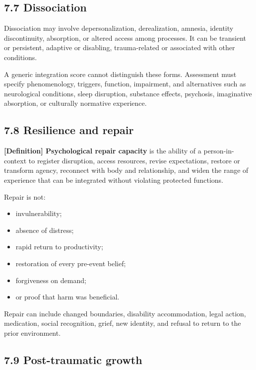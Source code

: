 \documentclass[
  11pt,
]{article}
\providecommand{\tightlist}{%
  \setlength{\itemsep}{0pt}\setlength{\parskip}{0pt}}
\begin{document}
\subsection{7.7 Dissociation}\label{dissociation}

Dissociation may involve depersonalization, derealization, amnesia,
identity discontinuity, absorption, or altered access among processes.
It can be transient or persistent, adaptive or disabling, trauma-related
or associated with other conditions.

A generic integration score cannot distinguish these forms. Assessment
must specify phenomenology, triggers, function, impairment, and
alternatives such as neurological conditions, sleep disruption,
substance effects, psychosis, imaginative absorption, or culturally
normative experience.

\subsection{7.8 Resilience and repair}\label{resilience-and-repair}

\textbf{{[}Definition{]} Psychological repair capacity} is the ability
of a person-in-context to register disruption, access resources, revise
expectations, restore or transform agency, reconnect with body and
relationship, and widen the range of experience that can be integrated
without violating protected functions.

Repair is not:

\begin{itemize}
\tightlist
\item
  invulnerability;
\item
  absence of distress;
\item
  rapid return to productivity;
\item
  restoration of every pre-event belief;
\item
  forgiveness on demand;
\item
  or proof that harm was beneficial.
\end{itemize}

Repair can include changed boundaries, disability accommodation, legal
action, medication, social recognition, grief, new identity, and refusal
to return to the prior environment.

\subsection{7.9 Post-traumatic growth}\label{post-traumatic-growth}
\end{document}
